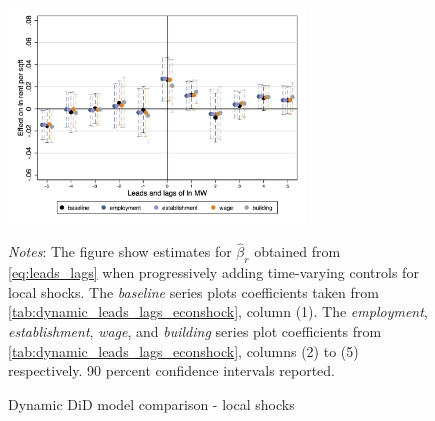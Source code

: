 
\begin{figure}[!h]
    \caption{Dynamic DiD model comparison - local shocks}
    \label{fig:}
    \centering
    \includegraphics[width = 0.7\textwidth]{../../analysis/first_differences/output/fd_models_control.png}
    \begin{minipage}{.95\textwidth} \footnotesize
		\vspace{2mm} 
		\textit{Notes}: The figure show estimates for $\hat{\beta}_{r}$ obtained from 
		\autoref{eq:leads_lags} when progressively adding time-varying controls for local shocks. 
		The \textit{baseline} series plots coefficients taken from 
		\autoref{tab:dynamic_leads_lags_econshock}, column (1). The \textit{employment}, 
		\textit{establishment}, \textit{wage}, and \textit{building} series plot coefficients 
		from \autoref{tab:dynamic_leads_lags_econshock}, columns (2) to (5) respectively. 90 
		percent confidence intervals reported.  
	\end{minipage}
\end{figure}